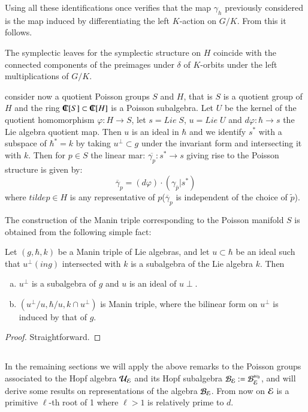 Using all these identifications once verifies that the map $\gamma_{h}$ previously considered is the map induced by differentiating the left $K$-action on $G/K$. From this it follows.

\begin{prop*}
The symplectic leaves for the symplectic structure on $H$ coincide with the connected components of the preimages under $\delta$ of $K$-orbits under the left multiplications of $G/K$.
\end{prop*}

consider now a quotient Poisson groups $S$ and $H$, that is $S$ is a quotient group of $H$ and the ring $\IC[S] \subset \IC[H]$ is a Poisson subalgebra. Let $U$ be the kernel of the quotient homomorphism $\varphi: H \rightarrow S$, let $s= Lie\; S$, $u = Lie\; U$ and $d\varphi : \hbar \rightarrow s$ the Lie algebra quotient map. Then $u$ is an ideal in $\hbar$ and we identify $s^{*}$ with a subspace of $\hbar^{*} =k$ by taking $u^{\perp} \subset g$ under the invariant form and intersecting it with $k$. Then for $p\in S$ the linear mar: $\overline{\gamma_{p}}: s^{*} \rightarrow s$ giving rise to the Poisson structure is given by:
$$
\overline{\gamma}_{p} = (d\varphi) \cdot (\gamma_{\overline{p}} | s^{*})
$$
where $tilde{p} \in H$ is any representative of $p$($\overline{\gamma}_{p}$ is independent of the choice of $\tilde{p}$).

The construction of the Manin triple corresponding to the Poisson manifold $S$ is obtained from the following simple fact:

\begin{lemma*}
Let $(g, \hbar, k)$ be a Manin triple of Lie algebras, and let $u \subset \hbar$ be an ideal such that $u^{\perp}(in g)$ intersected with $k$ is a subalgebra of the Lie algebra $k$. Then
\begin{enumerate}[(a)]
\item $u^{\perp}$ is a subalgebra of $g$ and $u$ is an ideal of $u\perp$.\label{art4-enum-l(a)}
\item $(u^{\perp}/u, \hbar/u, k\cap u^{\perp})$ is Manin triple, where the bilinear form on $u^{\perp}$ is induced by that of $g$.\label{art4-enum-l(a)}
\end{enumerate}
\end{lemma*}

\begin{proof}
Straightforward.
\end{proof}

\subsection{}\label{art4-subsec-4.3}
In the remaining sections we will apply the above remarks to the Poisson groups associated to the Hopf algebra $\mathcal{U}_{\mathcal{E}}$ and its Hopf subalgebra $\mathcal{B}_{\mathcal{E}}: = \mathcal{B}_{\mathcal{E}}^{w_{0}}$, and will derive some results on representations of the algebra $\mathcal{B}_{\mathcal{E}}$. From now on $\mathcal{E}$ is a primitive $\ell$-th root of 1 where $\ell > 1$ is relatively prime to $d$.

